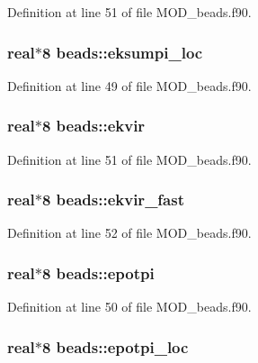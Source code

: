 Definition at line 51 of file M\-O\-D\-\_\-beads.\-f90.

\hypertarget{classbeads_a8045634dfdc1798472461ae15ea811ec}{
\subsubsection[{eksumpi\-\_\-loc}]{\setlength{\rightskip}{0pt plus 5cm}real$\ast$8 beads\-::eksumpi\-\_\-loc}}\label{classbeads_a8045634dfdc1798472461ae15ea811ec}


Definition at line 49 of file M\-O\-D\-\_\-beads.\-f90.

\hypertarget{classbeads_a64469ad6a8fb631a971525a333d77020}{
\subsubsection[{ekvir}]{\setlength{\rightskip}{0pt plus 5cm}real$\ast$8 beads\-::ekvir}}\label{classbeads_a64469ad6a8fb631a971525a333d77020}


Definition at line 51 of file M\-O\-D\-\_\-beads.\-f90.

\hypertarget{classbeads_aff38b015c1cc6a0ff0bf455ebcdcc7f7}{
\subsubsection[{ekvir\-\_\-fast}]{\setlength{\rightskip}{0pt plus 5cm}real$\ast$8 beads\-::ekvir\-\_\-fast}}\label{classbeads_aff38b015c1cc6a0ff0bf455ebcdcc7f7}


Definition at line 52 of file M\-O\-D\-\_\-beads.\-f90.

\hypertarget{classbeads_a2d5c492895271591b3cffae5d91a797e}{
\subsubsection[{epotpi}]{\setlength{\rightskip}{0pt plus 5cm}real$\ast$8 beads\-::epotpi}}\label{classbeads_a2d5c492895271591b3cffae5d91a797e}


Definition at line 50 of file M\-O\-D\-\_\-beads.\-f90.

\hypertarget{classbeads_abee4a239842256634947102c46707ff0}{
\subsubsection[{epotpi\-\_\-loc}]{\setlength{\rightskip}{0pt plus 5cm}real$\ast$8 beads\-::epotpi\-\_\-loc}}\label{classbeads_abee4a239842256634947102c46707ff0}


